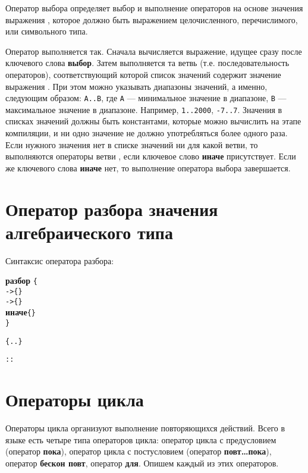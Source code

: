 \documentclass[10pt]{report}
\begin{document}
\is{}

Оператор выбора определяет выбор и выполнение операторов на основе значения выражения \textcolor{Green}{}, которое должно быть выражением целочисленного, перечислимого, или символьного типа.

Оператор выполняется так. Сначала вычисляется выражение, идущее сразу после ключевого слова \textbf{выбор}. Затем выполняется та ветвь (т.е. последовательность операторов), соответствующий которой список значений содержит значение выражения \textcolor{Green}{}. При этом можно указывать диапазоны значений, а именно, следующим образом: \texttt{A..B}, где \texttt{A} --- минимальное значение в диапазоне, \texttt{B} --- максимальное значение в диапазоне. Например, \texttt{1..2000}, \texttt{-7..7}. Значения в списках значений должны быть константами, которые можно вычислить на этапе компиляции, и ни одно значение не должно употребляться
более одного раза.  Если нужного значения нет в списке значений ни для какой ветви, то выполняются операторы ветви , если ключевое слово \textbf{иначе} присутствует. Если же ключевого слова \textbf{иначе} нет, то выполнение оператора выбора завершается.

\section{Оператор разбора значения алгебраического типа}
Синтаксис оператора разбора:

\is\textbf{разбор}  \texttt{\{}\\
\phantom{оператор_выбора8888888}\texttt{->}\texttt{\{}\texttt{\}}\\
\phantom{оператор_выбора8888888}\rbo{}\texttt{->}\texttt{\{}\texttt{\}}\rbc\kleene\\
\phantom{оператор_выбора8888888}\rbo\textbf{иначе}\texttt{\{}\texttt{\}}\rbc\optional\\
\phantom{оператор_выбора88}\indent\texttt{\}}

\is{}\texttt{\{..\}}

\is\rbo{}\texttt{::}\rbc\kleene{}

\section{Операторы цикла}
Операторы цикла организуют выполнение повторяющихся действий. Всего в языке есть четыре типа операторов цикла: оператор цикла с предусловием (оператор \textbf{\glqq пока\grqq}),
оператор цикла с постусловием (оператор \textbf{\glqq повт\dots пока\grqq}), оператор \textbf{\glqq бескон повт\grqq}, оператор \textbf{\glqq для\grqq}. Опишем каждый из этих операторов.
\end{document}
